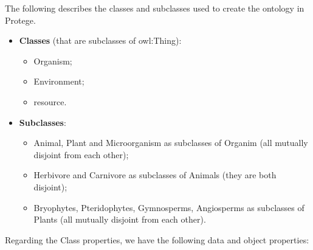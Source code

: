 The following describes the classes and subclasses used to create the ontology in Protege.
\\

\begin{itemize}
    \item \textbf{Classes} (that are subclasses of owl:Thing):
    \begin{itemize}
        \item Organism;

        \item Environment;

        \item resource.
    \end{itemize}

    \item \textbf{Subclasses}:
    \begin{itemize}
        \item Animal, Plant and Microorganism as subclasses of Organim (all mutually disjoint from each other);

        \item Herbivore and Carnivore as subclasses of Animals (they are both disjoint);

        \item Bryophytes, Pteridophytes, Gymnosperms, Angiosperms as subclasses of Plants (all mutually disjoint from each other).
        \\
    \end{itemize} 
\end{itemize}


Regarding the Class properties, we have the following data and object properties:
\\

